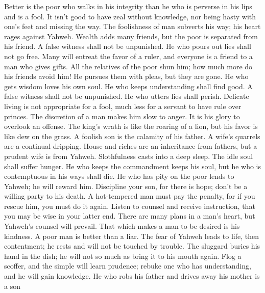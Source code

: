  Better is the poor who walks in his integrity than he who
is perverse in his lips and is a fool.  It isn't good to
have zeal without knowledge, nor being hasty with one's feet and missing
the way.  The foolishness of man subverts his way; his heart
rages against Yahweh.  Wealth adds many friends, but the
poor is separated from his friend.  A false witness shall
not be unpunished. He who pours out lies shall not go free. 
Many will entreat the favor of a ruler, and everyone is a friend to a
man who gives gifts.  All the relatives of the poor shun
him; how much more do his friends avoid him! He pursues them with pleas,
but they are gone.  He who gets wisdom loves his own soul.
He who keeps understanding shall find good.  A false witness
shall not be unpunished. He who utters lies shall perish. 
Delicate living is not appropriate for a fool, much less for a servant
to have rule over princes.  The discretion of a man makes
him slow to anger. It is his glory to overlook an offense. 
The king's wrath is like the roaring of a lion, but his favor is like
dew on the grass.  A foolish son is the calamity of his
father. A wife's quarrels are a continual dripping.  House
and riches are an inheritance from fathers, but a prudent wife is from
Yahweh.  Slothfulness casts into a deep sleep. The idle
soul shall suffer hunger.  He who keeps the commandment
keeps his soul, but he who is contemptuous in his ways shall die.
 He who has pity on the poor lends to Yahweh; he will
reward him.  Discipline your son, for there is hope; don't
be a willing party to his death.  A hot-tempered man must
pay the penalty, for if you rescue him, you must do it again.
 Listen to counsel and receive instruction, that you may be
wise in your latter end.  There are many plans in a man's
heart, but Yahweh's counsel will prevail.  That which makes
a man to be desired is his kindness. A poor man is better than a liar.
 The fear of Yahweh leads to life, then contentment; he
rests and will not be touched by trouble.  The sluggard
buries his hand in the dish; he will not so much as bring it to his
mouth again.  Flog a scoffer, and the simple will learn
prudence; rebuke one who has understanding, and he will gain knowledge.
 He who robs his father and drives away his mother is a son
